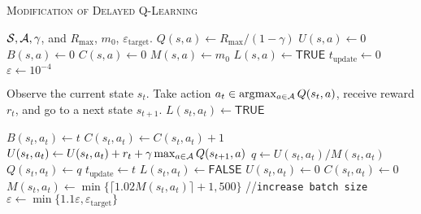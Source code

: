 \renewcommand{\algorithmiccomment}[1]{\hfill\eqparbox{COMMENT}{// #1}}

\begin{algorithm}[h!]
\small
   \caption{\textsc{Modification of Delayed Q-Learning}}
   \label{alg:alg1}
\begin{algorithmic}
   \REQUIRE ${\mathcal S}, {\mathcal A},\gamma$, and $R_{\max}$, $m_0$, $\varepsilon_{\mathrm{target}}$. 
    \STATE $Q(s, a) \leftarrow R_{\max}/(1-\gamma)$ {\color{blue}  } 
    \STATE $U(s,a) \leftarrow 0$    {\color{blue} }
    \STATE $B(s, a) \leftarrow 0$   {\color{blue}  }
    \STATE $C(s,a) \leftarrow 0$    {\color{blue}  } 
    \STATE $M(s, a) \leftarrow m_0$          {\color{blue}  }  
    \STATE $L(s,a)\leftarrow \textsf{TRUE} $   {\color{blue} } 
   \ENDFOR
   \STATE $t_{\textrm{update}} \leftarrow 0$  {\color{blue}  }
   \STATE $\varepsilon \leftarrow 10^{-4}$    {\color{blue}  }
   
    \STATE Observe the current state $s_t$. Take action $a_t \in \arg\!\max_{a\in {\mathcal A}} Q(s_t, a)$, receive reward $r_t$, and go to a next state $s_{t+1}$.    \alsp
     \alsp
        \STATE $L(s_t,a_t) \leftarrow \textsf{TRUE}$ \alsp
    \ENDIF
    
     \alsp
         \alsp
            \STATE $B(s_t,a_t)\leftarrow t$ \alsp
        \ENDIF
        \STATE $C(s_t,a_t) \leftarrow C(s_t,a_t) + 1$ \alsp
        \STATE $U(s_t, a_t) \leftarrow U(s_t, a_t) + r_t + \gamma \max_{a\in {\mathcal A}} Q(s_{t+1}, a)$   \alsp
         \alsp
            \STATE $q \leftarrow U(s_t, a_t)/M(s_t,a_t)$ \alsp
             \alsp
                \STATE $Q(s_t,a_t) \leftarrow q$ 
                \STATE $t_{\textrm{update}} \leftarrow t$ \alsp
             \alsp
                \STATE $L(s_t,a_t) \leftarrow \textsf{FALSE}$ \alsp
            \ENDIF
            \STATE $U(s_t,a_t) \leftarrow 0$ \alsp
            \STATE $C(s_t, a_t) \leftarrow 0$ \alsp
            \STATE $M(s_t, a_t) \leftarrow \min\{\lceil 1.02M(s_t,a_t)\rceil +1, 500\}$  {\color{blue} \alsp //{\texttt{increase batch size}}}
            \STATE $\varepsilon \leftarrow \min \{1.1\varepsilon, \varepsilon_{\mathrm{target}}\}$   {\color{blue}  }
        \ENDIF
    \ENDIF
   \ENDFOR             

\end{algorithmic}
\end{algorithm}

